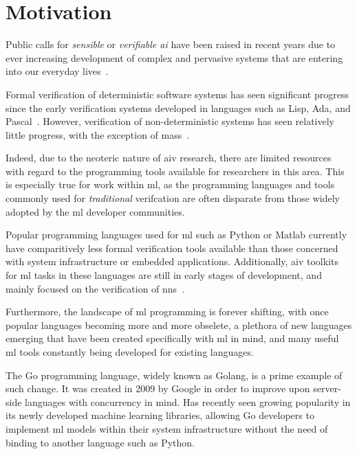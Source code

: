 \section{Motivation}

Public calls for \textit{sensible} or \textit{verifiable \Gls{ai}} have been raised in recent years due to ever increasing
development of complex and pervasive systems that are entering into our everyday lives~\citep{russell2016}.

Formal verification of deterministic software systems has seen significant progress since the early
verification systems developed in languages such as Lisp, Ada, and Pascal~\citep{polak1979, boyer1990, guaspari1993}. However,
verification of non-deterministic systems has seen relatively little progress, with the exception of
\Glspl{mas}~\citep{lomuscio2017, kouvaros2016}.

Indeed, due to the neoteric nature of \gls{aiv} research, there are limited resources with regard to the 
programming tools available for researchers in this area. This is especially true for work
within \gls{ml}, as the programming languages and tools commonly used for \textit{traditional} verifcation are often
disparate from those widely adopted by the \gls{ml} developer communities.

Popular programming languages used for \gls{ml} such as Python or Matlab currently have comparitively less
formal verification tools available than those concerned with system infrastructure or embedded applications.
Additionally, \gls{aiv} toolkits for \gls{ml} tasks in these languages are still in early stages of development, and mainly focused
on the verification of \glspl{nn}~\citep{kokke2020}. 

Furthermore, the landscape of \gls{ml} programming is forever shifting, with once popular languages
becoming more and more obselete, a plethora of new languages emerging that have been created
specifically with \gls{ml} in mind, and many useful \gls{ml} tools constantly being developed for existing languages.

The Go programming language, widely known as Golang, is a prime example of such change. It was created in 2009 by Google 
in order to improve upon server-side languages with concurrency in mind. Has recently seen growing popularity 
in its newly developed machine learning libraries, allowing Go developers to implement \gls{ml} models within 
their system infrastructure without the need of binding to another language such as Python.

